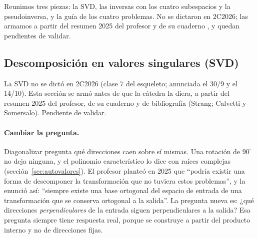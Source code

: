 Reunimos tres piezas: la SVD, las inversas con los cuatro subespacios y la pseudoinversa, y la guía de los cuatro problemas. No se dictaron en 2C2026; las armamos a partir del resumen 2025 del profesor y de su cuaderno , y quedan pendientes de validar.

\subsection{Descomposición en valores singulares (SVD)}\label{sec:svd}

{\small\vspace{1mm}\par}
{\small\vspace{1mm}\par}


\begin{atencion}[Anticipado]
La SVD no se dictó en 2C2026 (clase 7 del esqueleto; anunciada el 30/9 y el 14/10). Esta
sección se armó antes de que la cátedra la diera, a partir del resumen 2025 del profesor,
de su cuaderno  y de bibliografía (Strang; Calvetti y Somersalo).
Pendiente de validar.
\end{atencion}

\paragraph{Cambiar la pregunta.} Diagonalizar pregunta qué direcciones caen sobre sí
mismas. Una rotación de \(90^\circ\) no deja ninguna, y el polinomio característico lo dice
con raíces complejas (sección~\ref{sec:autovalores}). El profesor planteó en 2025 que
``podría existir una forma de descomponer la transformación que no tuviera estos
problemas'', y la enunció así: ``siempre existe una base ortogonal del espacio de entrada
de una transformación que se conserva ortogonal a la salida''. La pregunta nueva es:
¿qué direcciones \emph{perpendiculares} de la entrada siguen perpendiculares a la salida?
Esa pregunta siempre tiene respuesta real, porque se construye a partir del producto
interno y no de direcciones fijas.

